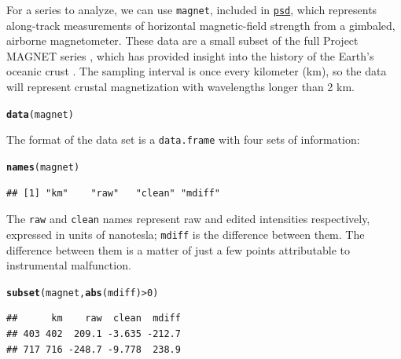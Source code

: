 \documentclass[10pt]{article}\usepackage{graphicx, color}
\makeatletter
\newcommand{\hlfunctioncall}[1]{\textcolor[rgb]{0.501960784313725,0,0.329411764705882}{\textbf{#1}}}%
\newenvironment{kframe}{%
 \def\at@end@of@kframe{}%
 \ifinner\ifhmode%
  \def\at@end@of@kframe{\end{minipage}}%
  \begin{minipage}{\columnwidth}%
 \fi\fi%
 \def\FrameCommand##1{\hskip\@totalleftmargin \hskip-\fboxsep
 \colorbox{shadecolor}{##1}\hskip-\fboxsep
     \hskip-\linewidth \hskip-\@totalleftmargin \hskip\columnwidth}%
 \MakeFramed {\advance\hsize-\width
   \@totalleftmargin\z@ \linewidth\hsize
   \@setminipage}}%
 {\par\unskip\endMakeFramed%
 \at@end@of@kframe}
\newenvironment{knitrout}{}{} %
\newcommand{\Rcmd}[1]{\texttt{#1}}
\newcommand{\psd}[0]{\href{http://abarbour.github.com/psd/}{\color{blue}\Rcmd{psd}}}
\makeatother
\begin{document}
For a series to analyze, we can use \Rcmd{magnet}, included in \psd{},
which represents along-track measurements
of horizontal magnetic-field strength from a gimbaled, airborne magnetometer.
These data are a small subset of the full Project MAGNET series \citep{coleman1992},
which has provided insight into
the history of the Earth's oceanic crust 
\citep{parker1997, obrien1999, korte2002}.
The sampling interval is
once every kilometer (km), so the data will represent
crustal magnetization with wavelengths longer than 2 km.
\begin{knitrout}
\color{fgcolor}\begin{kframe}
\begin{alltt}
\hlfunctioncall{data}(magnet)
\end{alltt}
\end{kframe}
\end{knitrout}

The format of the data set is a \Rcmd{data.frame} with four
sets of information:
\begin{knitrout}
\color{fgcolor}\begin{kframe}
\begin{alltt}
\hlfunctioncall{names}(magnet)
\end{alltt}
\begin{verbatim}
## [1] "km"    "raw"   "clean" "mdiff"
\end{verbatim}
\end{kframe}
\end{knitrout}

The \Rcmd{raw} and \Rcmd{clean} names represent raw
and edited intensities respectively, expressed in units of nanotesla; 
\Rcmd{mdiff} is the difference between them.
The difference between them is a matter of just a few points
attributable to instrumental malfunction. 
\begin{knitrout}
\color{fgcolor}\begin{kframe}
\begin{alltt}
\hlfunctioncall{subset}(magnet, \hlfunctioncall{abs}(mdiff) > 0)
\end{alltt}
\begin{verbatim}
##      km    raw  clean  mdiff
## 403 402  209.1 -3.635 -212.7
## 717 716 -248.7 -9.778  238.9
\end{verbatim}
\end{kframe}
\end{knitrout}
\end{document}
